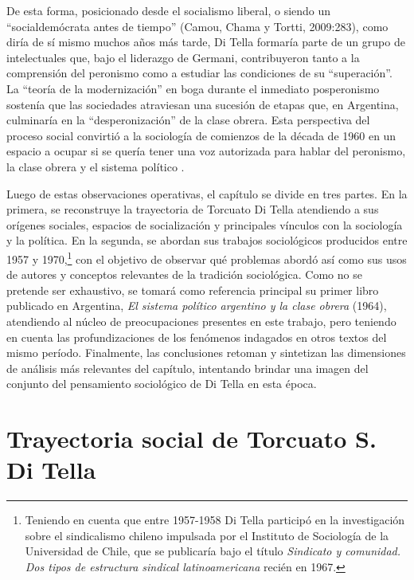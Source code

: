 De esta forma, posicionado desde el socialismo liberal, o siendo un \enquote{socialdemócrata antes de tiempo} (Camou, Chama y Tortti, 2009:283), como diría de sí mismo muchos años más tarde, Di Tella formaría parte de un grupo de intelectuales que, bajo el liderazgo de Germani, contribuyeron tanto a la comprensión del peronismo como a estudiar las condiciones de su \enquote{superación}. La \enquote{teoría de la modernización} en boga durante el inmediato posperonismo sostenía que las sociedades atraviesan una sucesión de etapas que, en Argentina, culminaría en la \enquote{desperonización} de la clase obrera. Esta perspectiva del proceso social convirtió a la sociología de comienzos de la década de 1960 en un espacio a ocupar si se quería tener una voz autorizada para hablar del peronismo, la clase obrera y el sistema político \parencite{1548-NEIBURG1998}.

Luego de estas observaciones operativas, el capítulo se divide en tres partes. En la primera, se reconstruye la trayectoria de Torcuato Di Tella atendiendo a sus orígenes sociales, espacios de socialización y principales vínculos con la sociología y la política. En la segunda, se abordan sus trabajos sociológicos producidos entre 1957 y 1970,\footnote{Teniendo en cuenta que entre 1957-1958 Di Tella participó en la investigación sobre el sindicalismo chileno impulsada por el Instituto de Sociología de la Universidad de Chile, que se publicaría bajo el título \emph{Sindicato y comunidad. Dos tipos de estructura sindical latinoamericana} recién en 1967.} con el objetivo de observar qué problemas abordó así como sus usos de autores y conceptos relevantes de la tradición sociológica. Como no se pretende ser exhaustivo, se tomará como referencia principal su primer libro publicado en Argentina, \emph{El sistema político argentino y la clase obrera} (1964), atendiendo al núcleo de preocupaciones presentes en este trabajo, pero teniendo en cuenta las profundizaciones de los fenómenos indagados en otros textos del mismo período. Finalmente, las conclusiones retoman y sintetizan las dimensiones de análisis más relevantes del capítulo, intentando brindar una imagen del conjunto del pensamiento sociológico de Di Tella en esta época.

\section{Trayectoria social de Torcuato S. Di Tella}

